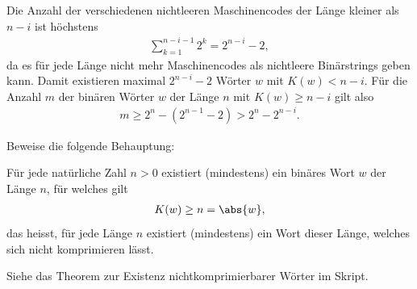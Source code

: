 \begin{questions}
\begin{solution}
		Die Anzahl der verschiedenen nichtleeren Maschinencodes der Länge kleiner als $n - i$ ist höchstens
		\begin{align*}
			\sum_{k=1}^{n - i - 1} 2^k = 2^{n-i} - 2,
		\end{align*}
		da es für jede Länge nicht mehr Maschinencodes als nichtleere Binärstrings geben kann. Damit existieren maximal $2^{n-i} - 2$ Wörter $w$ mit $K(w) < n - i$. Für die Anzahl $m$ der binären Wörter $w$ der Länge $n$ mit $K(w)\geq n - i$ gilt also
		\begin{align*}
			m\geq 2^n - (2^{n-1} - 2) > 2^n - 2^{n-i}.
		\end{align*}
	\end{solution}
	
	\question[2] Beweise die folgende Behauptung:
	\begin{center}
		Für jede natürliche Zahl $n>0$ existiert (mindestens) ein binäres Wort $w$ der Länge $n$, für welches gilt
		\begin{align*}
			K(w)\geq n = \abs{w},
		\end{align*}
		das heisst, für jede Länge $n$ existiert (mindestens) ein Wort dieser Länge, welches sich nicht komprimieren lässt.
	\end{center}
	\begin{solution}
		Siehe das Theorem zur Existenz nichtkomprimierbarer Wörter im Skript.
	\end{solution}
\end{questions}
